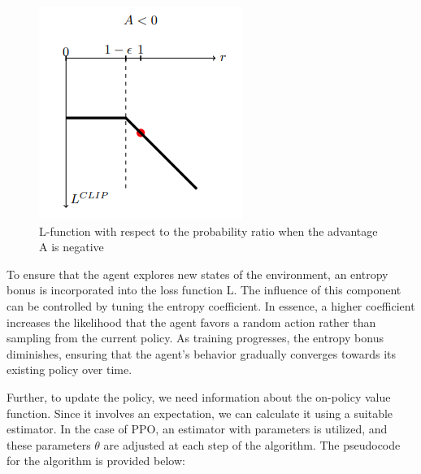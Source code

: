 \documentclass[conference]{IEEEtran}
\begin{document}
\begin{enumerate}
    \begin{figure}[!htb]
    \centering
    \includegraphics[width=0.6\columnwidth,keepaspectratio]{RL_project_update/negative.png}
    \caption{L-function with respect to the probability ratio when the
advantage A is negative}
    \label{fig:your_label}
    \end{figure}
    
\end{enumerate}


To ensure that the agent explores new states of the environment, an entropy bonus is incorporated into the loss function L. The influence of this component can be controlled by tuning the entropy coefficient. In essence, a higher coefficient increases the likelihood that the agent favors a random action rather than sampling from the current policy. As training progresses, the entropy bonus diminishes, ensuring that the agent's behavior gradually converges towards its existing policy over time.

Further, to update the policy, we need information about the on-policy value function. Since it involves an expectation, we can calculate it using a suitable estimator. In the case of PPO, an estimator with parameters is utilized, and these parameters ${\theta}$ are adjusted at each step of the algorithm. The pseudocode for the algorithm is provided below:


\end{document}
